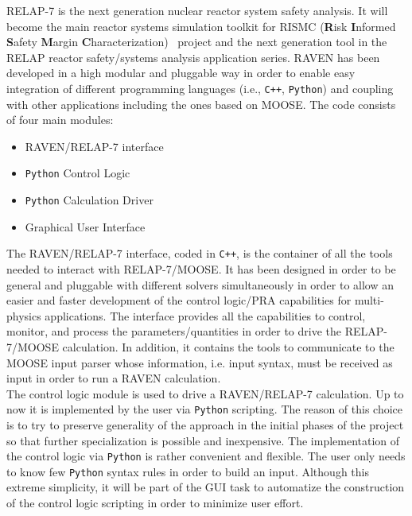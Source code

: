 \documentclass{anstrans}
\begin{document}
RELAP-7 is the next generation nuclear reactor system safety analysis. It will become the main reactor systems simulation toolkit for RISMC (\textbf{R}isk \textbf{I}nformed \textbf{S}afety \textbf{M}argin \textbf{C}haracterization)~\cite{mandelliANS_RISMC} project and the next generation tool in the RELAP reactor safety/systems analysis application series. 
RAVEN has been developed in a high modular and pluggable way in order to enable easy integration of different programming languages (i.e., \verb!C++!, \verb!Python!) and coupling with other applications including the ones based on MOOSE. The code consists of four main modules:
\begin{itemize}
\item RAVEN/RELAP-7 interface
\item \verb!Python! Control Logic 
\item \verb!Python! Calculation Driver
\item Graphical User Interface 
\end{itemize}

The RAVEN/RELAP-7 interface, coded in \verb!C++!, is the container of all the tools needed to interact with RELAP-7/MOOSE. It has been designed in order to be general and pluggable with different solvers simultaneously in order to allow an easier and faster development of the control logic/PRA capabilities for multi-physics applications.
The interface provides all the capabilities to control, monitor, and process the parameters/quantities in order to drive the RELAP-7/MOOSE calculation. In addition, it contains the tools to communicate to the MOOSE input parser whose information, i.e. input syntax, must be received as input in order to run a RAVEN  calculation.\\The control logic module is used to drive a RAVEN/RELAP-7 calculation. Up to now it is implemented by the user via \verb!Python! scripting. The reason of this choice is to try to preserve generality of the approach in the initial phases of the project so that further specialization is possible and  inexpensive. The implementation of the control logic via \verb!Python! is rather convenient and flexible. The user only needs to know few \verb!Python! syntax rules in order to build an input. Although this extreme simplicity, it will be part of the GUI task to automatize the construction of the control logic scripting in order to minimize user effort. 
\end{document}
